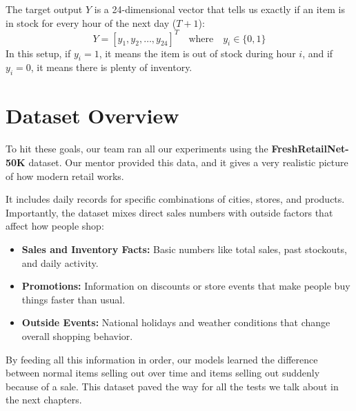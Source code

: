 The target output $Y$ is a 24-dimensional vector that tells us exactly if an item is in stock for every hour of the next day ($T+1$):
\begin{equation}
    Y = [y_1, y_2, \dots, y_{24}]^T \quad \text{where} \quad y_i \in \{0, 1\}
\end{equation}
In this setup, if $y_i = 1$, it means the item is out of stock during hour $i$, and if $y_i = 0$, it means there is plenty of inventory.

\section{Dataset Overview}

To hit these goals, our team ran all our experiments using the \textbf{FreshRetailNet-50K} dataset. Our mentor provided this data, and it gives a very realistic picture of how modern retail works.

It includes daily records for specific combinations of cities, stores, and products. Importantly, the dataset mixes direct sales numbers with outside factors that affect how people shop:

\begin{itemize}
    \item \textbf{Sales and Inventory Facts:} Basic numbers like total sales, past stockouts, and daily activity.
    \item \textbf{Promotions:} Information on discounts or store events that make people buy things faster than usual.
    \item \textbf{Outside Events:} National holidays and weather conditions that change overall shopping behavior.
\end{itemize}

By feeding all this information in order, our models learned the difference between normal items selling out over time and items selling out suddenly because of a sale. This dataset paved the way for all the tests we talk about in the next chapters.
